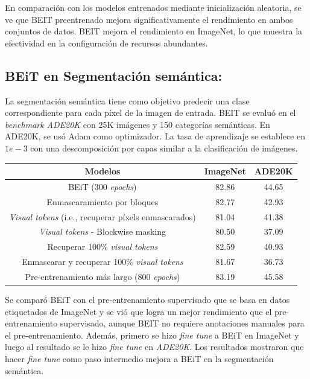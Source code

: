 En comparación con los modelos entrenados mediante inicialización aleatoria, se ve que BEIT preentrenado mejora significativamente el rendimiento en ambos conjuntos de datos. BEIT mejora el rendimiento en ImageNet, lo que muestra la efectividad en la configuración de recursos abundantes.

\subsection{BEiT en Segmentación semántica:}
La segmentación semántica tiene como objetivo predecir una clase correspondiente para cada píxel de la imagen de entrada. BEIT se evaluó en el \textit{benchmark ADE20K} \parencite{94} con 25K imágenes y 150 categorías semánticas. En ADE20K, se usó Adam como optimizador. La tasa de aprendizaje se establece en $1e-3$ con una descomposición por capas similar a la clasificación de imágenes. 

\begin{center}
    \begin{tabular}{||c c c ||} 
        \hline
        Modelos & ImageNet & ADE20K \\ [0.5ex] 
        \hline\hline
        BEiT (300 \textit{epochs}) & 82.86 & 44.65 \\ 
        \hline
        Enmascaramiento por bloques & 82.77 & 42.93 \\
        \hline
        \textit{Visual tokens} (i.e., recuperar píxels enmascarados) & 81.04 & 41.38 \\
        \hline
        \textit{Visual tokens} - Blockwise masking & 80.50 & 37.09 \\
        \hline
        Recuperar 100\% \textit{visual tokens} & 82.59 & 40.93 \\
        \hline
        Enmascarar y recuperar 100\% \textit{visual tokens} & 81.67 & 36.73 \\
        \hline
        Pre-entrenamiento más largo (800 \textit{epochs}) & 83.19 & 45.58 \\ [1ex] 
        \hline
    \end{tabular}
\end{center}

Se comparó BEiT con el pre-entrenamiento supervisado que se basa en datos etiquetados de ImageNet y se vió que logra un mejor rendimiento que el pre-entrenamiento supervisado, aunque BEIT no requiere anotaciones manuales para el pre-entrenamiento. Además, primero se hizo \textit{fine tune} a BEiT en ImageNet y luego al resultado se le hizo \textit{fine tune} en \textit{ADE20K}. Los resultados mostraron que hacer \textit{fine tune} como paso intermedio mejora a BEiT en la segmentación semántica.

